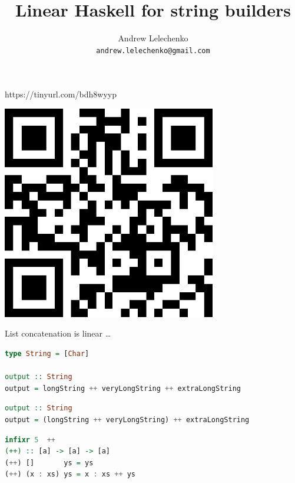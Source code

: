 \documentclass[handout]{beamer}
\title{Linear Haskell for string builders}
\author[Andrew Lelechenko]{Andrew Lelechenko \\ \texttt{andrew.lelechenko@gmail.com}}
\date{MuniHac, 13.09.2025 \par https://tinyurl.com/bdh8wyyp}
\begin{document}
\begin{frame}
  \titlepage

\end{frame}

\begin{frame}{https://tinyurl.com/bdh8wyyp}

\centerline{
\includegraphics[width=0.7\textwidth]{bdh8wyyp-400.png}
}

\end{frame}

\begin{frame}[fragile]{List concatenation is linear \dots}

\begin{lstlisting}[language=Haskell]
type String = [Char]

output :: String
output = longString ++ veryLongString ++ extraLongString
\end{lstlisting}

\begin{lstlisting}[language=Haskell]
output :: String
output = (longString ++ veryLongString) ++ extraLongString
\end{lstlisting}

\begin{lstlisting}[language=Haskell]
infixr 5  ++
(++) :: [a] -> [a] -> [a]
(++) []       ys = ys
(++) (x : xs) ys = x : xs ++ ys
\end{lstlisting}

\end{frame}
\end{document}
